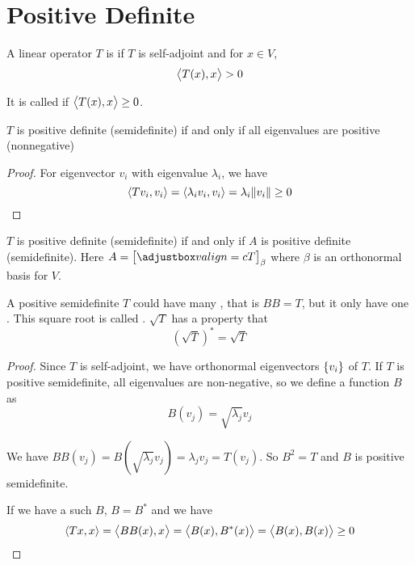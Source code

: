 \section{Positive Definite}

\begin{definition}
    A linear operator $T$ is  if $T$ is self-adjoint and for $x \in V$,
    \begin{equation}
        \left\langle \displaystyle T(x), x \right\rangle > 0
    \end{equation}
    
    It is called  if $\left\langle \displaystyle T(x), x \right\rangle \geq 0$.
\end{definition}

\begin{theorem}
    $T$ is positive definite (semidefinite) if and only if all eigenvalues are positive (nonnegative)
\end{theorem}
\begin{proof}
    For eigenvector $v_i$ with eigenvalue $\lambda_i$, we have 
    \begin{equation*}
        \left\langle \displaystyle Tv_i, v_i \right\rangle = \left\langle \displaystyle \lambda_i v_i, v_i \right\rangle = \lambda_i \norm{v_i} \geq 0
    \end{equation*}
\end{proof}

\begin{theorem}
$T$ is positive definite (semidefinite) if and only if $A$ is positive definite (semidefinite). Here $A = \coordinate{T}_\beta $ where $\beta$ is an orthonormal basis for $V$.
\end{theorem}


\begin{theorem}[$\sqrt{T}$]
   A positive semidefinite $T$ could have many , that is $BB = T$, but it only have one . This square root is called . $\sqrt{T}$ has a property that
   \begin{equation}
       \left(\sqrt{T}\right)^* = \sqrt{T}
   \end{equation}   
\end{theorem}
\begin{proof}
    Since $T$ is self-adjoint, we have orthonormal eigenvectors $\set{v_i}$ of $T$. If $T$ is positive semidefinite, all eigenvalues are non-negative, so we define a function $B$ as
    \begin{equation*}
        B(v_j) = \sqrt{\lambda_j} v_j
    \end{equation*}
    
    We have $BB(v_j) = B\left(\sqrt{\lambda_j} v_j\right) = \lambda_j v_j = T(v_j)$. So $B^2= T$ and $B$ is positive semidefinite.
    
    If we have a such $B$, $B=B^*$ and we have
    \begin{equation*}
        \left\langle \displaystyle Tx, x \right\rangle = \left\langle \displaystyle BB(x), x \right\rangle = \left\langle \displaystyle B(x), B^*(x) \right\rangle = \left\langle \displaystyle B(x), B(x) \right\rangle \geq 0
    \end{equation*}
    
\end{proof}




